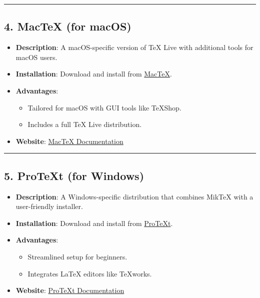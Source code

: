\documentclass[
]{book}
\providecommand{\tightlist}{%
  \setlength{\itemsep}{0pt}\setlength{\parskip}{0pt}}
\theoremstyle{definition}
\theoremstyle{definition}
\theoremstyle{definition}
\theoremstyle{definition}
\theoremstyle{remark}
\begin{document}
\begin{center}\rule{0.5\linewidth}{0.5pt}\end{center}

\subsection{\texorpdfstring{4. \textbf{MacTeX} (for macOS)}{4. MacTeX (for macOS)}}\label{mactex-for-macos}

\begin{itemize}
\tightlist
\item
  \textbf{Description}: A macOS-specific version of TeX Live with additional tools for macOS users.
\item
  \textbf{Installation}: Download and install from \href{https://www.tug.org/mactex/}{MacTeX}.
\item
  \textbf{Advantages}:

  \begin{itemize}
  \tightlist
  \item
    Tailored for macOS with GUI tools like TeXShop.
  \item
    Includes a full TeX Live distribution.
  \end{itemize}
\item
  \textbf{Website}: \href{https://www.tug.org/mactex/}{MacTeX Documentation}
\end{itemize}

\begin{center}\rule{0.5\linewidth}{0.5pt}\end{center}

\subsection{\texorpdfstring{5. \textbf{ProTeXt} (for Windows)}{5. ProTeXt (for Windows)}}\label{protext-for-windows}

\begin{itemize}
\tightlist
\item
  \textbf{Description}: A Windows-specific distribution that combines MikTeX with a user-friendly installer.
\item
  \textbf{Installation}: Download and install from \href{https://www.tug.org/protext/}{ProTeXt}.
\item
  \textbf{Advantages}:

  \begin{itemize}
  \tightlist
  \item
    Streamlined setup for beginners.
  \item
    Integrates LaTeX editors like TeXworks.
  \end{itemize}
\item
  \textbf{Website}: \href{https://www.tug.org/protext/}{ProTeXt Documentation}
\end{itemize}
\end{document}
